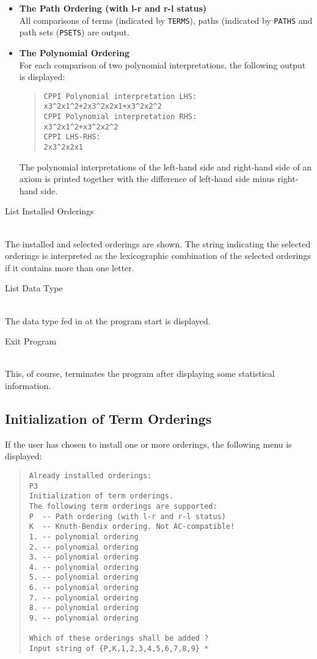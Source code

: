 \begin{enumerate}
\begin{itemize}
\item{\bf The Path Ordering (with l-r and r-l status)}\\
All comparisons of terms (indicated by {\tt TERMS}), paths (indicated by
{\tt PATHS} and path sets ({\tt PSETS}) are output.

\item{\bf The Polynomial Ordering}\\
For each comparison of two polynomial interpretations, the following
output is displayed:

\begin{quote}
\begin{verbatim}
CPPI Polynomial interpretation LHS:
x3^2x1^2+2x3^2x2x1+x3^2x2^2
CPPI Polynomial interpretation RHS:
x3^2x1^2+x3^2x2^2
CPPI LHS-RHS:
2x3^2x2x1
\end{verbatim}
\end{quote}

The polynomial interpretations of the left-hand side and right-hand side of an
axiom is printed together with the difference of left-hand side minus
right-hand side.
\end{itemize}

{\bf \item{List Installed Orderings}}\\
The installed and selected orderings are shown. The string indicating the
selected orderings is interpreted as the lexicographic combination
of the selected orderings if it contains more than one letter. 


{\bf \item{List Data Type}}\\ 
The data type fed in at the program start is displayed.

\setcounter{enumi}{-1}
{\bf \item{Exit Program}}\\
This, of course, terminates the program after displaying some
statistical information.
\end{enumerate}

\subsection{Initialization of Term Orderings}
\label{InitializationOfOrderings}%
If the user has chosen to install one or more orderings, the following 
menu is displayed:

\begin{quote}
\begin{verbatim}
Already installed orderings:
P3
Initialization of term orderings.
The following term orderings are supported:
P  -- Path ordering (with l-r and r-l status)
K  -- Knuth-Bendix ordering. Not AC-compatible!
1. -- polynomial ordering
2. -- polynomial ordering
3. -- polynomial ordering
4. -- polynomial ordering
5. -- polynomial ordering
6. -- polynomial ordering
7. -- polynomial ordering
8. -- polynomial ordering
9. -- polynomial ordering

Which of these orderings shall be added ?
Input string of {P,K,1,2,3,4,5,6,7,8,9} *
\end{verbatim}
\end{quote}

